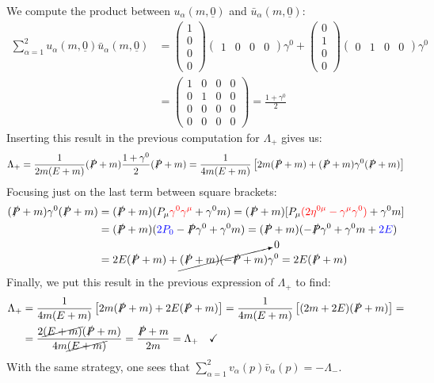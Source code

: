 \documentclass[../main.tex]{subfiles}
\begin{document}
We compute the product between $u_\alpha(m,\underline{0})$ and $\bar{u}_\alpha(m,\underline{0})$:
\begin{align*}
\sum_{\alpha=1}^2 u_\alpha(m,\underline{0})\bar{u}_\alpha(m,\underline{0})&=\left(\begin{array}{c}
   1 \\
   0 \\
   0 \\
   0
\end{array}\right)\left(\begin{array}{cccc}
1 & 0 & 0 & 0
\end{array}\right)\gamma^0+\left(\begin{array}{c}
   0 \\
   1 \\
   0 \\
   0
\end{array}\right)\left(\begin{array}{cccc}
0 & 1 & 0 & 0
\end{array}\right)\gamma^0\\
&=\left(\begin{array}{cccc}
    1 & 0 & 0 & 0 \\
    0 & 1 & 0 & 0 \\
    0 & 0 & 0 & 0 \\
    0 & 0 & 0 & 0 
\end{array}\right)=\frac{1+\gamma^0}{2}
\end{align*}
Inserting this result in the previous computation for $\Lambda_+$ gives us:
\[
\Lambda_+=\frac{1}{2m(E+m)}(\slashed{P}+m)\frac{1+\gamma^0}{2}(\slashed{P}+m)=\frac{1}{4m(E+m)}\left[2m(\slashed{P}+m)+(\slashed{P}+m)\gamma^0(\slashed{P}+m)\right]
\]
Focusing just on the last term between square brackets:
\begin{align*}
(\slashed{P}+m)\gamma^0(\slashed{P}+m)&=(\slashed{P}+m)(P_\mu{\color{red}\gamma^0\gamma^\mu}+\gamma^0m)=(\slashed{P}+m)[P_\mu{\color{red}(2\eta^{0\mu}-\gamma^\mu\gamma^0)}+\gamma^0m]\\
&=(\slashed{P}+m)({\color{blue}2P_0}-\slashed{P}\gamma^0+\gamma^0m)=(\slashed{P}+m)(-\slashed{P}\gamma^0+\gamma^0m+{\color{blue}2E})\\
&=2E(\slashed{P}+m)+\cancelto{0}{(\slashed{P}+m)(-\slashed{P}+m)}\gamma^0=2E(\slashed{P}+m)
\end{align*}
Finally, we put this result in the previous expression of $\Lambda_+$ to find:
\begin{align*}
\Lambda_+&=\frac{1}{4m(E+m)}\left[2m(\slashed{P}+m)+2E(\slashed{P}+m)\right]=\frac{1}{4m(E+m)}\left[(2m+2E)(\slashed{P}+m)\right]=\\
&=\frac{2\cancel{(E+m)}(\slashed{P}+m)}{4m\cancel{(E+m)}}=\frac{\slashed{P}+m}{2m}=\Lambda_+ \quad \checkmark
\end{align*}
With the same strategy, one sees that $\sum_{\alpha=1}^2v_\alpha(p)\bar{v}_\alpha(p)=-\Lambda_-$.
\end{document}
